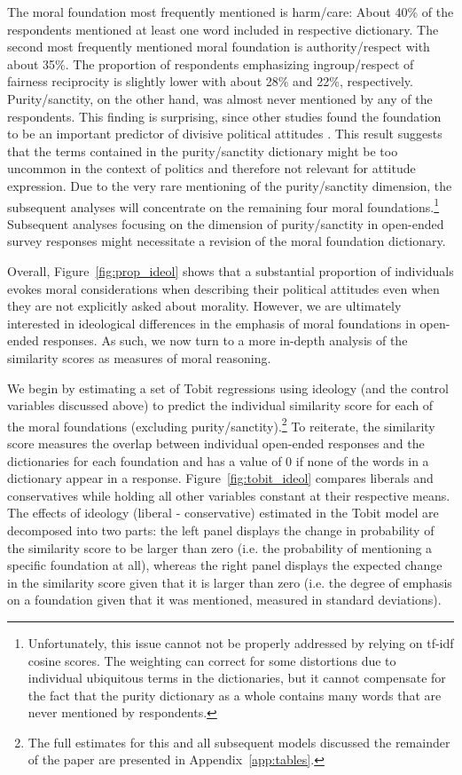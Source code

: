 \documentclass[12pt]{article}
\begin{document}
The moral foundation most frequently mentioned is harm/care: About 40\% of the respondents mentioned at least one word included in respective dictionary. The second most frequently mentioned moral foundation is authority/respect with about 35\%. The proportion of respondents emphasizing ingroup/respect of fairness reciprocity is slightly lower with about 28\% and 22\%, respectively. Purity/sanctity, on the other hand, was almost never mentioned by any of the respondents. This finding is surprising, since other studies found the foundation to be an important predictor of divisive political attitudes \citep{koleva2012tracing}. This result suggests that the terms contained in the purity/sanctity dictionary might be too uncommon in the context of politics and therefore not relevant for attitude expression. Due to the very rare mentioning of the purity/sanctity dimension, the subsequent analyses will concentrate on the remaining four moral foundations.\footnote{Unfortunately, this issue cannot not be properly addressed by relying on tf-idf cosine scores. The weighting can correct for some distortions due to individual ubiquitous terms in the dictionaries, but it cannot compensate for the fact that the purity dictionary as a whole contains many words that are never mentioned by respondents.} Subsequent analyses focusing on the dimension of purity/sanctity in open-ended survey responses might necessitate a revision of the moral foundation dictionary.

Overall, Figure~\ref{fig:prop_ideol} shows that a substantial proportion of individuals evokes moral considerations when describing their political attitudes even when they are not explicitly asked about morality. However, we are ultimately interested in ideological differences in the emphasis of moral foundations in open-ended responses. As such, we now turn to a more in-depth analysis of the similarity scores as measures of moral reasoning.

We begin by estimating a set of Tobit regressions using ideology (and the control variables discussed above) to predict the individual similarity score for each of the moral foundations (excluding purity/sanctity).\footnote{The full estimates for this and all subsequent models discussed the remainder of the paper are presented in Appendix~\ref{app:tables}.} To reiterate, the similarity score measures the overlap between individual open-ended responses and the dictionaries for each foundation and has a value of 0 if none of the words in a dictionary appear in a response. Figure~\ref{fig:tobit_ideol} compares liberals and conservatives while holding all other variables constant at their respective means. The effects of ideology (liberal - conservative) estimated in the Tobit model are decomposed into two parts: the left panel displays the change in probability of the similarity score to be larger than zero (i.e. the probability of mentioning a specific foundation at all), whereas the right panel displays the expected change in the similarity score given that it is larger than zero (i.e. the degree of emphasis on a foundation given that it was mentioned, measured in standard deviations).
\end{document}
